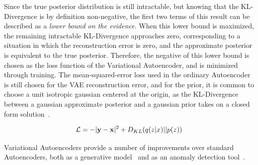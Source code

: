 \documentclass[12pt, a4paper]{article}
\begin{document}
Since the true posterior distribution is still intractable, but knowing that the KL-Divergence is by definition non-negative, the first two terms of this result can be described as a \textit{lower bound on the evidence}. When this lower bound is maximized, the remaining intractable KL-Divergence approaches zero, corresponding to a situation in which the reconstruction error is zero, and the approximate posterior is equivalent to the true posterior. Therefore, the negative of this lower bound is chosen as the loss function of the Variational Autoencoder, and is minimized through training. The mean-squared-error loss used in the ordinary Autoencoder is still chosen for the VAE reconstruction error, and for the prior, it is common to choose a unit isotropic gaussian centered at the origin, as the KL-Divergence between a gaussian approximate posterior and a gaussian prior takes on a closed form solution~\cite{Goodfellow-et-al-2016}.

\begin{equation}
	\mathcal{L} = - |{\textbf y} - {\textbf x}|^{2} + D_{KL}(q(z|x)||p(z))
\end{equation} 


Variational Autoencoders provide a number of improvements over standard Autoencoders, both as a generative model~\cite{kingma2014autoencoding} and as an anomaly detection tool~\cite{An2015VariationalAB}. 
\end{document}
